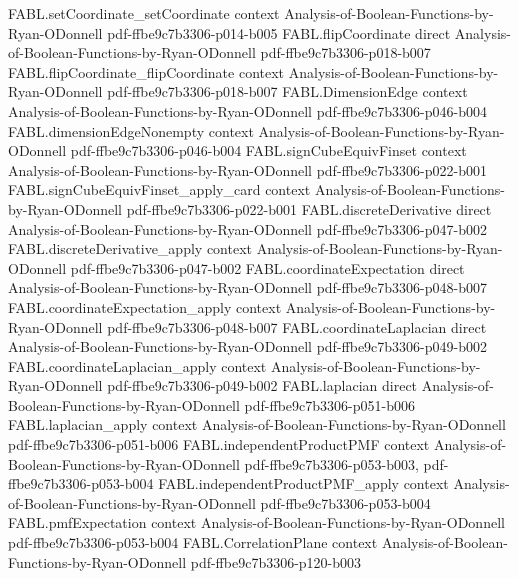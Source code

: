 \begin{theorem}
\proofstep
  {FABL.setCoordinate_setCoordinate}
  {context}
  {Analysis-of-Boolean-Functions-by-Ryan-ODonnell}
  {pdf-ffbe9c7b3306-p014-b005}
\proofstep
  {FABL.flipCoordinate}
  {direct}
  {Analysis-of-Boolean-Functions-by-Ryan-ODonnell}
  {pdf-ffbe9c7b3306-p018-b007}
\proofstep
  {FABL.flipCoordinate_flipCoordinate}
  {context}
  {Analysis-of-Boolean-Functions-by-Ryan-ODonnell}
  {pdf-ffbe9c7b3306-p018-b007}
\proofstep
  {FABL.DimensionEdge}
  {context}
  {Analysis-of-Boolean-Functions-by-Ryan-ODonnell}
  {pdf-ffbe9c7b3306-p046-b004}
\proofstep
  {FABL.dimensionEdgeNonempty}
  {context}
  {Analysis-of-Boolean-Functions-by-Ryan-ODonnell}
  {pdf-ffbe9c7b3306-p046-b004}
\proofstep
  {FABL.signCubeEquivFinset}
  {context}
  {Analysis-of-Boolean-Functions-by-Ryan-ODonnell}
  {pdf-ffbe9c7b3306-p022-b001}
\proofstep
  {FABL.signCubeEquivFinset_apply_card}
  {context}
  {Analysis-of-Boolean-Functions-by-Ryan-ODonnell}
  {pdf-ffbe9c7b3306-p022-b001}
\proofstep
  {FABL.discreteDerivative}
  {direct}
  {Analysis-of-Boolean-Functions-by-Ryan-ODonnell}
  {pdf-ffbe9c7b3306-p047-b002}
\proofstep
  {FABL.discreteDerivative_apply}
  {context}
  {Analysis-of-Boolean-Functions-by-Ryan-ODonnell}
  {pdf-ffbe9c7b3306-p047-b002}
\proofstep
  {FABL.coordinateExpectation}
  {direct}
  {Analysis-of-Boolean-Functions-by-Ryan-ODonnell}
  {pdf-ffbe9c7b3306-p048-b007}
\proofstep
  {FABL.coordinateExpectation_apply}
  {context}
  {Analysis-of-Boolean-Functions-by-Ryan-ODonnell}
  {pdf-ffbe9c7b3306-p048-b007}
\proofstep
  {FABL.coordinateLaplacian}
  {direct}
  {Analysis-of-Boolean-Functions-by-Ryan-ODonnell}
  {pdf-ffbe9c7b3306-p049-b002}
\proofstep
  {FABL.coordinateLaplacian_apply}
  {context}
  {Analysis-of-Boolean-Functions-by-Ryan-ODonnell}
  {pdf-ffbe9c7b3306-p049-b002}
\proofstep
  {FABL.laplacian}
  {direct}
  {Analysis-of-Boolean-Functions-by-Ryan-ODonnell}
  {pdf-ffbe9c7b3306-p051-b006}
\proofstep
  {FABL.laplacian_apply}
  {context}
  {Analysis-of-Boolean-Functions-by-Ryan-ODonnell}
  {pdf-ffbe9c7b3306-p051-b006}
\proofstep
  {FABL.independentProductPMF}
  {context}
  {Analysis-of-Boolean-Functions-by-Ryan-ODonnell}
  {pdf-ffbe9c7b3306-p053-b003,
    pdf-ffbe9c7b3306-p053-b004}
\proofstep
  {FABL.independentProductPMF_apply}
  {context}
  {Analysis-of-Boolean-Functions-by-Ryan-ODonnell}
  {pdf-ffbe9c7b3306-p053-b004}
\proofstep
  {FABL.pmfExpectation}
  {context}
  {Analysis-of-Boolean-Functions-by-Ryan-ODonnell}
  {pdf-ffbe9c7b3306-p053-b004}
\proofstep
  {FABL.CorrelationPlane}
  {context}
  {Analysis-of-Boolean-Functions-by-Ryan-ODonnell}
  {pdf-ffbe9c7b3306-p120-b003}

\end{theorem}
